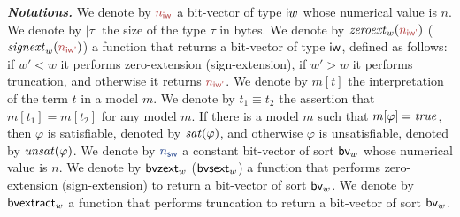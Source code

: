 \noindent \textbf{\textit{Notations.}}
We denote by $\bvval{n}{w}$ a bit-vector of type $\textsf{i$w$}$ whose numerical value is $n$.
We denote by $|\tau|$ the size of the type $\tau$ in bytes.
We denote by $\zeroext{w}{\bvval{n}{w'}}$ ($\signext{w}{\bvval{n}{w'}}$) a function that returns a bit-vector of type $\textsf{iw}$, defined as follows:
if $w' < w$ it performs zero-extension (sign-extension),
if $w' > w$ it performs truncation,
and otherwise it returns $\bvval{n}{w'}$.
We denote by $m[t]$ the interpretation of the term $t$ in a model $m$.
We denote by $t_1\equiv t_2$ the assertion that $m[t_1] = m[t_2]$ for any model $m$.
If there is a model $m$ such that $m[\varphi] = \mathit{true}$,
then $\varphi$ is satisfiable, denoted by $\mathit{sat}(\varphi)$,
and otherwise $\varphi$ is unsatisfiable, denoted by $\mathit{unsat}(\varphi)$.
We denote by $\bvconst{w}{n}$ a constant bit-vector of sort $\textsf{bv}_{w}$ whose numerical value is $n$.
We denote by $\textsf{bvzext}_{w}$ ($\textsf{bvsext}_{w}$) a function that performs zero-extension (sign-extension) to return a bit-vector of sort $\textsf{bv}_{w}$.
We denote by $\textsf{bvextract}_{w}$ a function that performs truncation to return a bit-vector of sort $\textsf{bv}_{w}$.
